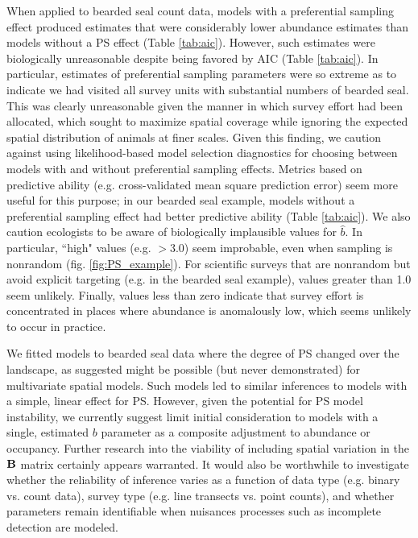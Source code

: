 \documentclass[times,mee,doublespace,]{besauth2}
\begin{document}
When applied to bearded seal count data, models with a preferential sampling effect produced estimates that were considerably lower abundance estimates than models without a PS effect (Table \ref{tab:aic}).  However, such estimates were biologically unreasonable despite being favored by AIC (Table \ref{tab:aic}).  In particular, estimates of preferential sampling parameters were so extreme as to indicate we had visited all survey units with substantial numbers of bearded seal.  This was clearly unreasonable given the manner in which survey effort had been allocated, which sought to maximize spatial coverage while ignoring the expected spatial distribution of animals at finer scales.  Given this finding, we caution against using likelihood-based model selection diagnostics for choosing between models with and without preferential sampling effects.  Metrics based on predictive ability (e.g. cross-validated mean square prediction error) seem more useful for this purpose; in our bearded seal example, models without a preferential sampling effect had better predictive ability (Table \ref{tab:aic}).  We also caution ecologists to be aware of biologically implausible values for $\hat{b}$.  In particular, ``high" values (e.g. $>3.0$) seem improbable, even when sampling is nonrandom (fig. \ref{fig:PS_example}).  For scientific surveys that are nonrandom but avoid explicit targeting (e.g. in the bearded seal example), values greater than 1.0 seem unlikely.  Finally, values less than zero indicate that survey effort is concentrated in places where abundance is anomalously low, which seems unlikely to occur in practice.

We fitted models to bearded seal data where the degree of PS changed over the landscape, as \citet{RoyleBerliner1999} suggested might be possible (but never demonstrated) for multivariate spatial models. Such models led to similar inferences to models with a simple, linear effect for PS.  However, given the potential for PS model instability, we currently suggest limit initial consideration to models with a single, estimated $b$ parameter as a composite adjustment to abundance or occupancy.  Further research into the viability of including spatial variation in the ${\bf B}$ matrix certainly appears warranted.  It would also be worthwhile to investigate whether the reliability of inference varies as a function of data type (e.g. binary vs. count data), survey type (e.g. line transects vs. point counts), and whether parameters remain identifiable when nuisances processes such as incomplete detection are modeled.
\end{document}
